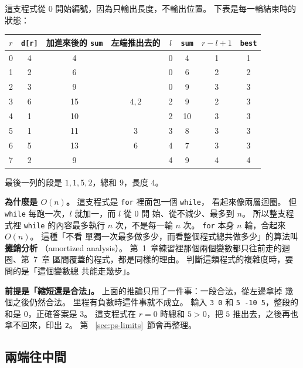 
這支程式從 $0$ 開始編號，因為只輸出長度，不輸出位置。 下表是每一輪結束時的
狀態：

\begin{center}
\begin{tabular}{cccccccc}
\toprule
$r$ & \texttt{d[r]} & 加進來後的 \texttt{sum} & 左端推出去的 & $l$ &
\texttt{sum} & $r - l + 1$ & \texttt{best} \\
\midrule
0 & 4 & 4 & & 0 & 4 & 1 & 1 \\
1 & 2 & 6 & & 0 & 6 & 2 & 2 \\
2 & 3 & 9 & & 0 & 9 & 3 & 3 \\
3 & 6 & 15 & $4, 2$ & 2 & 9 & 2 & 3 \\
4 & 1 & 10 & & 2 & 10 & 3 & 3 \\
5 & 1 & 11 & $3$ & 3 & 8 & 3 & 3 \\
6 & 5 & 13 & $6$ & 4 & 7 & 3 & 3 \\
7 & 2 & 9 & & 4 & 9 & 4 & 4 \\
\bottomrule
\end{tabular}
\end{center}

最後一列的段是 $1, 1, 5, 2$，總和 $9$，長度 $4$。

\textbf{為什麼是 $O(n)$。} 這支程式是 \texttt{for} 裡面包一個 \texttt{while}，
看起來像兩層迴圈。 但 \texttt{while} 每跑一次，$l$ 就加一，而 $l$ 從 $0$ 開
始、從不減少、最多到 $n$。 所以整支程式裡 \texttt{while} 的內容最多執行 $n$
次，不是每一輪 $n$ 次。 \texttt{for} 本身 $n$ 輪，合起來 $O(n)$。 這種「不看
單獨一次最多做多少，而看整個程式總共做多少」的算法叫\textbf{攤銷分析}
（amortized analysis）。 第~1~章練習裡那個兩個變數都只往前走的迴圈、第~7~章
區間覆蓋的程式，都是同樣的理由。 判斷這類程式的複雜度時，要問的是「這個變數總
共能走幾步」。

\textbf{前提是「縮短還是合法」。} 上面的推論只用了一件事：一段合法，從左邊拿掉
幾個之後仍然合法。 里程有負數時這件事就不成立。 輸入 \texttt{3 0} 和
\texttt{5 -10 5}，整段的和是 $0$，正確答案是 $3$。 這支程式在 $r = 0$ 時總和
$5 > 0$，把 $5$ 推出去，之後再也拿不回來，印出 \texttt{2}。 第
~\ref{sec:ps-limits}~節會再整理。

\subsection{兩端往中間}

